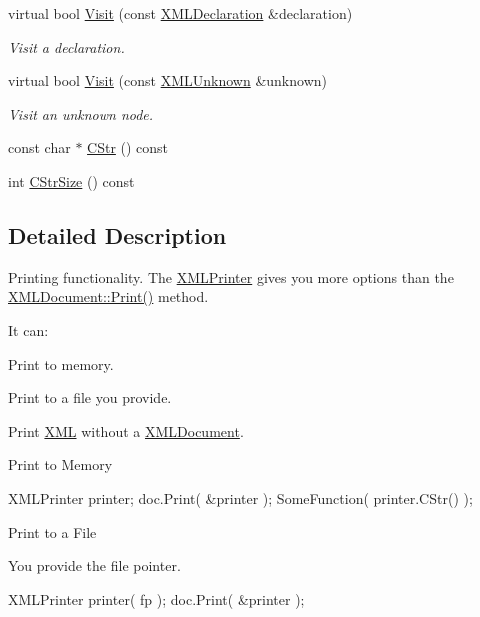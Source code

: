 \begin{DoxyCompactItemize}
virtual bool \hyperlink{classtinyxml2_1_1_x_m_l_printer_acfc625b2549304b9c7eb85ebd5c5eb39}{Visit} (const \hyperlink{classtinyxml2_1_1_x_m_l_declaration}{X\-M\-L\-Declaration} \&declaration)
\begin{DoxyCompactList}\small\item\em Visit a declaration. \end{DoxyCompactList}\item 
virtual bool \hyperlink{classtinyxml2_1_1_x_m_l_printer_ab8af5455bbf9e4be2663e6642fcd7e32}{Visit} (const \hyperlink{classtinyxml2_1_1_x_m_l_unknown}{X\-M\-L\-Unknown} \&unknown)
\begin{DoxyCompactList}\small\item\em Visit an unknown node. \end{DoxyCompactList}\item 
const char $\ast$ \hyperlink{classtinyxml2_1_1_x_m_l_printer_a4a1b788e11b540921ec50687cd2b24a9}{C\-Str} () const 
\item 
int \hyperlink{classtinyxml2_1_1_x_m_l_printer_a02c3c5f8c6c007dcbaf10595d9e22bf0}{C\-Str\-Size} () const 
\end{DoxyCompactItemize}


\subsection{Detailed Description}
Printing functionality. The \hyperlink{classtinyxml2_1_1_x_m_l_printer}{X\-M\-L\-Printer} gives you more options than the \hyperlink{classtinyxml2_1_1_x_m_l_document_a686ea28672c0e0c60383ec28148c1ac0}{X\-M\-L\-Document\-::\-Print()} method.

It can\-:
\begin{DoxyEnumerate}
\item Print to memory.
\item Print to a file you provide.
\item Print \hyperlink{namespace_x_m_l}{X\-M\-L} without a \hyperlink{classtinyxml2_1_1_x_m_l_document}{X\-M\-L\-Document}.
\end{DoxyEnumerate}

Print to Memory

\begin{DoxyVerb}XMLPrinter printer;
doc.Print( &printer );
SomeFunction( printer.CStr() );
\end{DoxyVerb}


Print to a File

You provide the file pointer. \begin{DoxyVerb}XMLPrinter printer( fp );
doc.Print( &printer );
\end{DoxyVerb}



